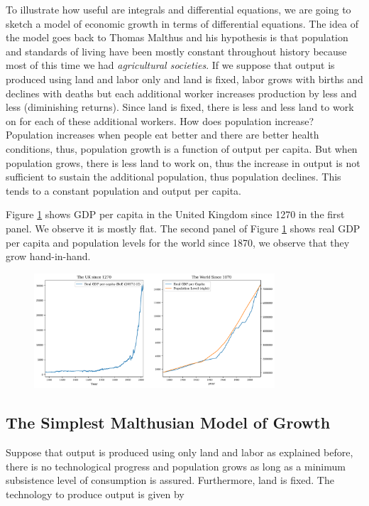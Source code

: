 \documentclass[a4paper,11pt]{article}
\theoremstyle{definition}
\theoremstyle{plain}
\begin{document}
To illustrate how useful are integrals and differential equations, we are going to sketch a model of economic growth in terms of differential equations. The idea of the model goes back to Thomas Malthus and his hypothesis is that population and standards of living have been mostly constant throughout history because most of this time we had
\emph{agricultural societies}. If we suppose that output is produced using land and labor only and land is fixed, labor grows with births and declines with deaths but each additional worker increases production by less and less (diminishing returns). Since land is fixed, there is less and less land to work on for each of these additional workers. How does population increase? Population increases when people eat better and
there are better health conditions, thus, population growth is a function of output per capita. But when population grows, there is less land to work on, thus the increase in output is not sufficient to sustain the additional population, thus population declines. This tends to a constant population and output per capita.

Figure \ref{fig:gdppc_uk} shows GDP per capita in the United Kingdom since 1270 in the first panel. We observe it is mostly flat. The second panel of Figure \ref{fig:gdppc_uk} shows real GDP per capita and population levels for the world since 1870, we observe that they grow hand-in-hand.

 \begin{figure}[htbp]
 	\centering 
 		\includegraphics[width = 0.8\textwidth]{Ch3_files/Ch3_25_0.pdf}
 		\caption{}
 		\label{fig:gdppc_uk}
 \end{figure}
    

\subsection{The Simplest Malthusian Model of Growth}\label{the-simplest-malthusian-model-of-growth}

Suppose that output is produced using only land and labor as explained before, there is no technological progress and population grows as long as a minimum subsistence level of consumption is assured. Furthermore, land is fixed. The technology to produce output is given by
\end{document}
